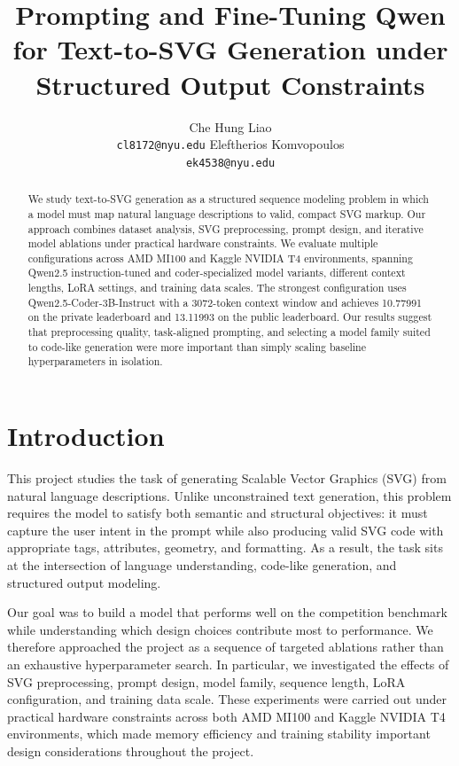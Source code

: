 \documentclass[11pt]{article}
\title{Prompting and Fine-Tuning Qwen for Text-to-SVG Generation under Structured Output Constraints}
\author{
  Che Hung Liao \\
  \texttt{cl8172@nyu.edu}
  \And
  Eleftherios Komvopoulos \\
  \texttt{ek4538@nyu.edu}
}
\begin{document}
\maketitle

\begin{abstract}
We study text-to-SVG generation as a structured sequence modeling problem in
which a model must map natural language descriptions to valid, compact SVG
markup. Our approach combines dataset analysis, SVG preprocessing, prompt
design, and iterative model ablations under practical hardware constraints. We
evaluate multiple configurations across AMD MI100 and Kaggle NVIDIA T4
environments, spanning Qwen2.5 instruction-tuned and coder-specialized model
variants, different context lengths, LoRA settings, and training data scales.
The strongest configuration uses Qwen2.5-Coder-3B-Instruct with a 3072-token
context window and achieves 10.77991 on the private leaderboard and 13.11993
on the public leaderboard. Our results suggest that preprocessing quality,
task-aligned prompting, and selecting a model family suited to code-like
generation were more important than simply scaling baseline hyperparameters in
isolation.
\end{abstract}

\section{Introduction}

This project studies the task of generating Scalable Vector Graphics (SVG)
from natural language descriptions. Unlike unconstrained text generation, this
problem requires the model to satisfy both semantic and structural objectives:
it must capture the user intent in the prompt while also producing valid SVG
code with appropriate tags, attributes, geometry, and formatting. As a
result, the task sits at the intersection of language understanding, code-like
generation, and structured output modeling.

Our goal was to build a model that performs well on the competition benchmark
while understanding which design choices contribute most to performance. We
therefore approached the project as a sequence of targeted ablations rather
than an exhaustive hyperparameter search. In particular, we investigated the
effects of SVG preprocessing, prompt design, model family, sequence length,
LoRA configuration, and training data scale. These experiments were carried
out under practical hardware constraints across both AMD MI100 and Kaggle
NVIDIA T4 environments, which made memory efficiency and training stability
important design considerations throughout the project.
\end{document}
